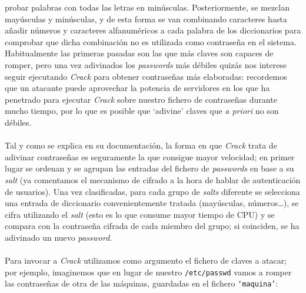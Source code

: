 probar palabras con todas las letras en min\'usculas. Posteriormente, se
mezclan may\'usculas y min\'usculas, y de esta forma se van combinando 
caracteres hasta a\~nadir n\'umeros y caracteres alfanum\'ericos a cada palabra
de los diccionarios para comprobar que dicha combinaci\'on no es utilizada
como contrase\~na en el sistema. Habitualmente las primeras pasadas son las
que m\'as claves son capaces de romper, pero una vez adivinados los {\it
passwords} m\'as d\'ebiles quiz\'as nos interese seguir ejecutando {\it Crack}
para obtener contrase\~nas m\'as elaboradas: recordemos que un atacante
puede aprovechar la potencia de servidores en los que ha penetrado para ejecutar
{\it Crack} sobre nuestro fichero de contrase\~nas durante mucho tiempo, por lo
que es posible que `adivine' claves que {\it a priori} no son d\'ebiles.\\
\\Tal y como se explica en su documentaci\'on, la forma en que {\it Crack}
trata de adivinar contrase\~nas es seguramente la que consigue mayor velocidad;
en primer lugar se ordenan y se agrupan las entradas del fichero de {\it 
passwords} en base a su {\it salt} (ya comentamos el mecanismo de cifrado a la
hora de hablar de autenticaci\'on de usuarios). Una vez clasificadas, para
cada grupo de {\it salts} diferente se selecciona una entrada de diccionario
convenientemente tratada (may\'usculas, n\'umeros\ldots), se cifra utilizando
el {\it salt} (esto es lo que consume mayor tiempo de CPU) y se compara con
la contrase\~na cifrada de cada miembro del grupo; si coinciden, se ha
adivinado un nuevo {\it password}.\\
\\Para invocar a {\it Crack} utilizamos como argumento el fichero de claves a
atacar; por ejemplo, imaginemos que en lugar de nuestro {\tt /etc/passwd} vamos
a romper las contrase\~nas de otra de las m\'aquinas, guardadas en el fichero
{\tt `maquina'}:
